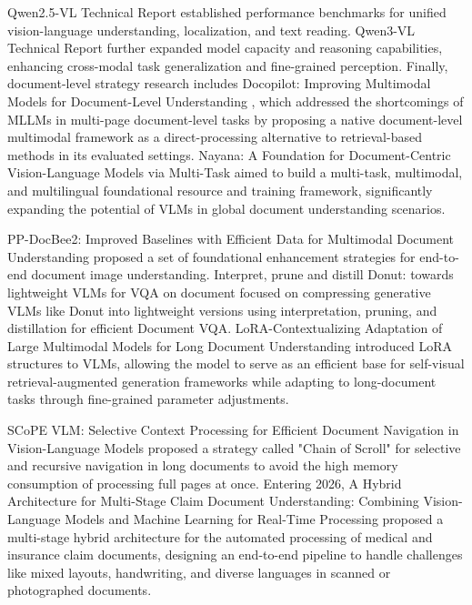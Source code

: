 Qwen2.5-VL Technical Report \cite{bai2025qwen25vl} established performance benchmarks for unified vision-language understanding, localization, and text reading. Qwen3-VL Technical Report \cite{bai2025qwen3vl} further expanded model capacity and reasoning capabilities, enhancing cross-modal task generalization and fine-grained perception. Finally, document-level strategy research includes Docopilot: Improving Multimodal Models for Document-Level Understanding \cite{duan2025docopilot}, which addressed the shortcomings of MLLMs in multi-page document-level tasks by proposing a native document-level multimodal framework as a direct-processing alternative to retrieval-based methods in its evaluated settings. Nayana: A Foundation for Document-Centric Vision-Language Models via Multi-Task \cite{kolavi2025nayana} aimed to build a multi-task, multimodal, and multilingual foundational resource and training framework, significantly expanding the potential of VLMs in global document understanding scenarios.

PP-DocBee2: Improved Baselines with Efficient Data for Multimodal Document Understanding \cite{du2025docbee2} proposed a set of foundational enhancement strategies for end-to-end document image understanding. Interpret, prune and distill Donut: towards lightweight VLMs for VQA on document \cite{zhou2025donutdistill} focused on compressing generative VLMs like Donut into lightweight versions using interpretation, pruning, and distillation for efficient Document VQA. LoRA-Contextualizing Adaptation of Large Multimodal Models for Long Document Understanding \cite{li2025loracontext} introduced LoRA structures to VLMs, allowing the model to serve as an efficient base for self-visual retrieval-augmented generation frameworks while adapting to long-document tasks through fine-grained parameter adjustments.

SCoPE VLM: Selective Context Processing for Efficient Document Navigation in Vision-Language Models \cite{wang2025scopevlm} proposed a strategy called "Chain of Scroll" for selective and recursive navigation in long documents to avoid the high memory consumption of processing full pages at once. Entering 2026, A Hybrid Architecture for Multi-Stage Claim Document Understanding: Combining Vision-Language Models and Machine Learning for Real-Time Processing \cite{patel2026claim} proposed a multi-stage hybrid architecture for the automated processing of medical and insurance claim documents, designing an end-to-end pipeline to handle challenges like mixed layouts, handwriting, and diverse languages in scanned or photographed documents.


